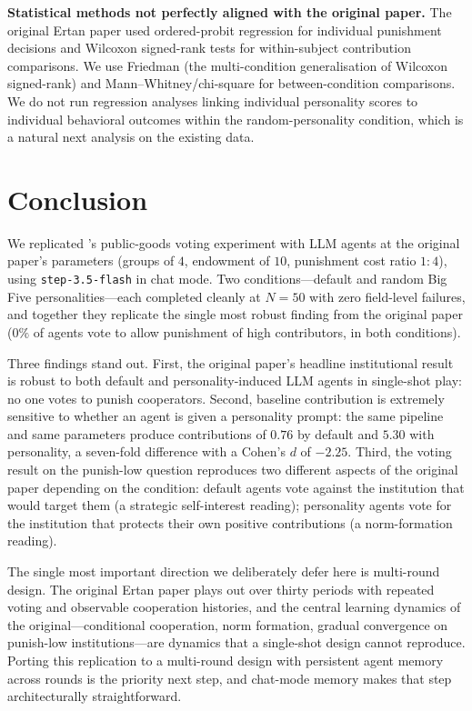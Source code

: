 \documentclass[12pt, a4paper]{article}
\begin{document}
\textbf{Statistical methods not perfectly aligned with the original paper.} The original Ertan paper used ordered-probit regression for individual punishment decisions and Wilcoxon signed-rank tests for within-subject contribution comparisons. We use Friedman (the multi-condition generalisation of Wilcoxon signed-rank) and Mann--Whitney/chi-square for between-condition comparisons. We do not run regression analyses linking individual personality scores to individual behavioral outcomes within the random-personality condition, which is a natural next analysis on the existing data.

\section{Conclusion}

We replicated \citet{ertan2009who}'s public-goods voting experiment with LLM agents at the original paper's parameters (groups of $4$, endowment of $10$, punishment cost ratio $1{:}4$), using \texttt{step-3.5-flash} in chat mode. Two conditions---default and random Big Five personalities---each completed cleanly at $N=50$ with zero field-level failures, and together they replicate the single most robust finding from the original paper ($0\%$ of agents vote to allow punishment of high contributors, in both conditions).

Three findings stand out. First, the original paper's headline institutional result is robust to both default and personality-induced LLM agents in single-shot play: no one votes to punish cooperators. Second, baseline contribution is extremely sensitive to whether an agent is given a personality prompt: the same pipeline and same parameters produce contributions of $0.76$ by default and $5.30$ with personality, a seven-fold difference with a Cohen's $d$ of $-2.25$. Third, the voting result on the punish-low question reproduces two different aspects of the original paper depending on the condition: default agents vote against the institution that would target them (a strategic self-interest reading); personality agents vote for the institution that protects their own positive contributions (a norm-formation reading).

The single most important direction we deliberately defer here is multi-round design. The original Ertan paper plays out over thirty periods with repeated voting and observable cooperation histories, and the central learning dynamics of the original---conditional cooperation, norm formation, gradual convergence on punish-low institutions---are dynamics that a single-shot design cannot reproduce. Porting this replication to a multi-round design with persistent agent memory across rounds is the priority next step, and chat-mode memory makes that step architecturally straightforward.
\end{document}
